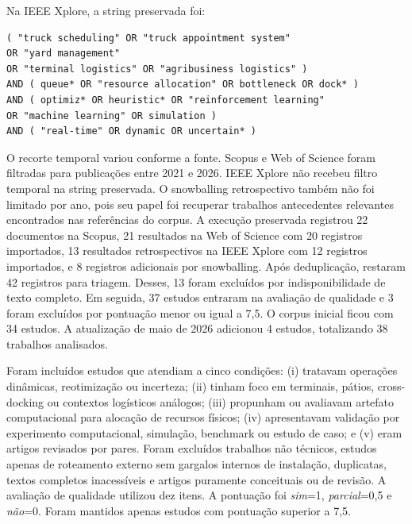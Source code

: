 \documentclass[
  12pt,
  oneside,
  a4paper,
  sumario=tradicional,
  brazil
]{abntex2}
\begin{document}
Na IEEE Xplore, a string preservada foi:
{\scriptsize
\begin{verbatim}
( "truck scheduling" OR "truck appointment system"
OR "yard management"
OR "terminal logistics" OR "agribusiness logistics" )
AND ( queue* OR "resource allocation" OR bottleneck OR dock* )
AND ( optimiz* OR heuristic* OR "reinforcement learning"
OR "machine learning" OR simulation )
AND ( "real-time" OR dynamic OR uncertain* )
\end{verbatim}
}

O recorte temporal variou conforme a fonte. Scopus e Web of Science foram filtradas para publica\c{c}\~oes entre 2021 e 2026. IEEE Xplore n\~ao recebeu filtro temporal na string preservada. O snowballing retrospectivo tamb\'em n\~ao foi limitado por ano, pois seu papel foi recuperar trabalhos antecedentes relevantes encontrados nas refer\^encias do corpus. A execu\c{c}\~ao preservada registrou 22 documentos na Scopus, 21 resultados na Web of Science com 20 registros importados, 13 resultados retrospectivos na IEEE Xplore com 12 registros importados, e 8 registros adicionais por snowballing. Ap\'os deduplica\c{c}\~ao, restaram 42 registros para triagem. Desses, 13 foram exclu\'idos por indisponibilidade de texto completo. Em seguida, 37 estudos entraram na avalia\c{c}\~ao de qualidade e 3 foram exclu\'idos por pontua\c{c}\~ao menor ou igual a 7,5. O corpus inicial ficou com 34 estudos. A atualiza\c{c}\~ao de maio de 2026 adicionou 4 estudos, totalizando 38 trabalhos analisados.

Foram inclu\'idos estudos que atendiam a cinco condi\c{c}\~oes: (i) tratavam opera\c{c}\~oes din\^amicas, reotimiza\c{c}\~ao ou incerteza; (ii) tinham foco em terminais, p\'atios, cross-docking ou contextos log\'isticos an\'alogos; (iii) propunham ou avaliavam artefato computacional para aloca\c{c}\~ao de recursos f\'isicos; (iv) apresentavam valida\c{c}\~ao por experimento computacional, simula\c{c}\~ao, benchmark ou estudo de caso; e (v) eram artigos revisados por pares. Foram exclu\'idos trabalhos n\~ao t\'ecnicos, estudos apenas de roteamento externo sem gargalos internos de instala\c{c}\~ao, duplicatas, textos completos inacess\'iveis e artigos puramente conceituais ou de revis\~ao. A avalia\c{c}\~ao de qualidade utilizou dez itens. A pontua\c{c}\~ao foi \textit{sim}=1, \textit{parcial}=0,5 e \textit{n\~ao}=0. Foram mantidos apenas estudos com pontua\c{c}\~ao superior a 7,5.
\end{document}
